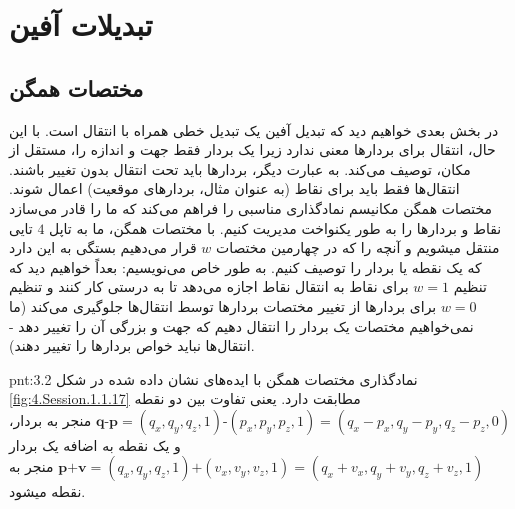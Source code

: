 \section{\textbf{تبدیلات آفین}}
\label{sec:3.2}

\subsection{\textbf{مختصات همگن}}
\label{subsec:3.2.1}
{
    \Large
    \begin{spacing}{1.5}
        در بخش بعدی خواهیم دید که تبدیل آفین یک تبدیل خطی همراه با انتقال است.
        با این حال، انتقال برای بردارها معنی ندارد زیرا یک بردار فقط جهت و اندازه را، مستقل از مکان، توصیف می‌کند.
        به عبارت دیگر، بردارها باید تحت انتقال بدون تغییر باشند.
        انتقال‌ها فقط باید برای نقاط (به عنوان مثال، بردارهای موقعیت) اعمال شوند.
        مختصات همگن مکانیسم نمادگذاری مناسبی را فراهم می‌کند که ما را قادر می‌سازد نقاط و بردارها را به طور یکنواخت مدیریت کنیم.
        با مختصات همگن، ما به تاپل $4$ تایی منتقل میشویم و آنچه را که در چهارمین مختصات $w$ قرار می‌دهیم بستگی به این دارد که یک نقطه یا بردار را توصیف کنیم.
        به طور خاص می‌نویسیم:
        بعداً خواهیم دید که تنظیم $w=1$ برای نقاط به انتقال نقاط اجازه می‌دهد تا به درستی کار کنند
        و تنظیم $w=0$  برای بردارها از تغییر مختصات بردارها توسط انتقال‌ها جلوگیری می‌کند
        (ما نمی‌خواهیم مختصات یک بردار را انتقال دهیم که جهت و بزرگی آن را تغییر دهد - انتقال‌ها نباید خواص بردارها را تغییر دهند).

        \begin{point}{pnt:3.2}
            \Large
            نمادگذاری مختصات همگن با ایده‌های نشان داده شده در شکل \ref{fig:4.Session.1.1.17} مطابقت دارد.
            یعنی تفاوت بین دو نقطه $\textbf{q-p}=(q_{x}, q_{y}, q_{z}, 1) \textbf{-} (p_{x}, p_{y}, p_{z}, 1) = (q_{x}-p_{x}, q_{y}-p_{y}, q_{z}-p_{z}, 0)$ منجر به بردار،
            و یک نقطه به اضافه یک بردار $\textbf{p+v}=(q_{x}, q_{y}, q_{z},1) \textbf{+} (v_{x}, v_{y}, v_{z}, 1) = (q_{x}+v_{x}, q_{y}+v_{y}, q_{z}+v_{z}, 1)$ منجر به نقطه میشود.
        \end{point}
    \end{spacing}
}

